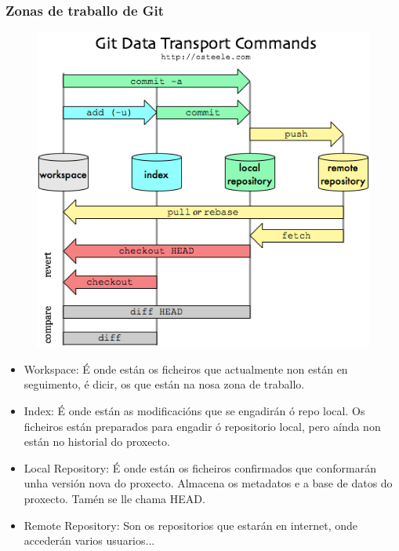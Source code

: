 \begin{frame}[fragile]
  \frametitle{Zonas de traballo de Git}
  \begin{multicols}{2}
    \begin{figure}
      \centering
      \includegraphics[width=1\linewidth]{./img/flujo-git}
      \label{fig:flujo-git}
    \end{figure}
    \columnbreak
    \tiny
    \begin{itemize}
    \item Workspace: É onde están os ficheiros que actualmente non están en seguimento, é dicir, os que están na nosa zona de traballo.
    \item Index: É onde están as modificacións que se engadirán ó repo local. Os ficheiros están preparados para engadir ó repositorio local, pero aínda non están no historial do proxecto. 
    \item Local Repository: É onde están os ficheiros confirmados que conformarán unha versión nova do proxecto. Almacena os metadatos e a base de datos do proxecto. Tamén se lle chama HEAD.
    \item Remote Repository: Son os repositorios que estarán en internet, onde accederán varios usuarios...
    \end{itemize}
  \end{multicols}
\end{frame}

